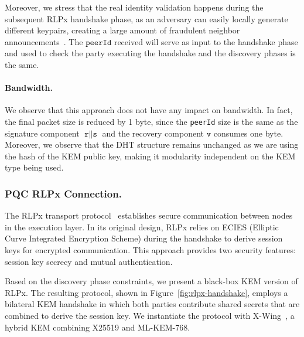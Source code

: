Moreover, we stress that the real identity validation happens during the subsequent RLPx handshake phase, as an adversary can easily locally generate different keypairs, creating a large amount of fraudulent neighbor announcements~\cite{EPRINT:MarHeiGol18}. 
The $\texttt{peerId}$ received will serve as input to the handshake phase and used to check the party executing the handshake and the discovery phases is the same. 

\paragraph{Bandwidth.}\label{para:discovery-efficiency} We observe that this approach does not have any impact on bandwidth.
In fact, the final packet size is reduced by 1 byte, since the \texttt{peerId} size is the same as the signature component $\texttt{r}\parallel \texttt{s}$ and the recovery component $\texttt{v}$ consumes one byte. 
Moreover, we observe that the DHT structure remains unchanged as we are using the hash of the KEM public key, making it modularity independent on the KEM type being used.





\subsubsection{PQC RLPx Connection.}\label{subsubsec:pqc-rlpx}

The RLPx transport protocol~\cite{ethereum_rlpx} establishes secure communication between nodes in the execution layer.
In its original design, RLPx relies on ECIES (Elliptic Curve Integrated Encryption Scheme) during the handshake to derive session keys for encrypted communication.
This approach provides two security features: session key secrecy and mutual authentication.


Based on the discovery phase constraints, we present a black-box KEM version of RLPx.
The resulting protocol, shown in Figure~\ref{fig:rlpx-handshake}, employs a bilateral KEM handshake in which both parties contribute shared secrets that are combined to derive the session key.
We instantiate the protocol with X-Wing~\cite{EPRINT:BCDKSV24}, a hybrid KEM combining X25519 and ML-KEM-768.

